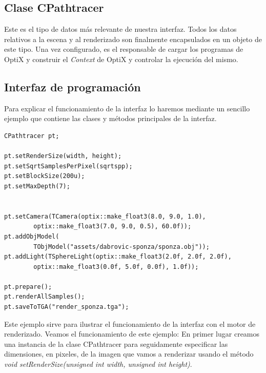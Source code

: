 \subsection{Clase CPathtracer}

Este es el tipo de datos más relevante de nuestra interfaz. Todos los datos relativos a la escena y al renderizado son finalmente encapsulados en un objeto de este tipo. Una vez configurado, es el responsable de cargar los programas de OptiX y construir el \emph{Context} de OptiX y controlar la ejecución del mismo.

\subsection{Interfaz de programación}

Para explicar el funcionamiento de la interfaz lo haremos mediante un sencillo ejemplo que contiene las clases y métodos principales de la interfaz.




\lstset{style=customc}

\begin{lstlisting}
CPathtracer pt;

pt.setRenderSize(width, height);
pt.setSqrtSamplesPerPixel(sqrtspp);
pt.setBlockSize(200u);
pt.setMaxDepth(7);


pt.setCamera(TCamera(optix::make_float3(8.0, 9.0, 1.0), 
		optix::make_float3(7.0, 9.0, 0.5), 60.0f));
pt.addObjModel(
		TObjModel("assets/dabrovic-sponza/sponza.obj"));
pt.addLight(TSphereLight(optix::make_float3(2.0f, 2.0f, 2.0f),
		optix::make_float3(0.0f, 5.0f, 0.0f), 1.0f));

pt.prepare();
pt.renderAllSamples();
pt.saveToTGA("render_sponza.tga");
\end{lstlisting}

Este ejemplo sirve para ilustrar el funcionamiento de la interfaz con el motor de renderizado.
Veamos el funcionamiento de este ejemplo:
En primer lugar creamos una instancia de la clase CPathtracer para seguidamente especificar las dimensiones, en pixeles, de la imagen que vamos a renderizar usando el método \emph{void setRenderSize(unsigned int width, unsigned int height)}. 

